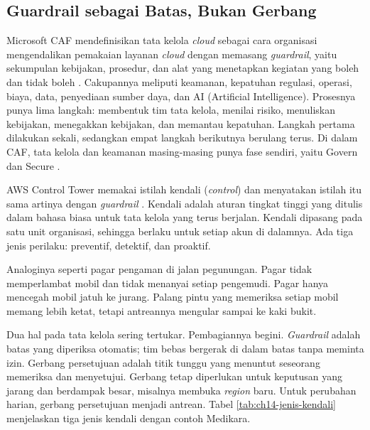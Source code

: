 \subsection{Guardrail sebagai Batas, Bukan Gerbang}

Microsoft CAF mendefinisikan tata kelola \textit{cloud} sebagai cara organisasi mengendalikan
pemakaian layanan \textit{cloud} dengan memasang \textit{guardrail}, yaitu sekumpulan kebijakan,
prosedur, dan alat yang menetapkan kegiatan yang boleh dan tidak boleh \cite{c14-azure-govern}.
Cakupannya meliputi keamanan, kepatuhan regulasi, operasi, biaya, data, penyediaan sumber daya, dan
AI (Artificial Intelligence). Prosesnya punya lima langkah: membentuk tim tata kelola, menilai
risiko, menuliskan kebijakan, menegakkan kebijakan, dan memantau kepatuhan. Langkah pertama
dilakukan sekali, sedangkan empat langkah berikutnya berulang terus. Di dalam CAF, tata kelola dan
keamanan masing-masing punya fase sendiri, yaitu Govern dan Secure \cite{azurecaf}.

AWS Control Tower memakai istilah kendali (\textit{control}) dan menyatakan istilah itu sama artinya
dengan \textit{guardrail} \cite{c14-aws-controls}. Kendali adalah aturan tingkat tinggi yang ditulis
dalam bahasa biasa untuk tata kelola yang terus berjalan. Kendali dipasang pada satu unit
organisasi, sehingga berlaku untuk setiap akun di dalamnya. Ada tiga jenis perilaku: preventif,
detektif, dan proaktif.

Analoginya seperti pagar pengaman di jalan pegunungan. Pagar tidak memperlambat mobil dan tidak
menanyai setiap pengemudi. Pagar hanya mencegah mobil jatuh ke jurang. Palang pintu yang
memeriksa setiap mobil memang lebih ketat, tetapi antreannya mengular sampai ke kaki bukit.

Dua hal pada tata kelola sering tertukar. Pembagiannya begini. \textit{Guardrail} adalah batas yang
diperiksa otomatis; tim bebas bergerak di dalam batas tanpa meminta izin. Gerbang persetujuan adalah
titik tunggu yang menuntut seseorang memeriksa dan menyetujui. Gerbang tetap diperlukan untuk
keputusan yang jarang dan berdampak besar, misalnya membuka \textit{region} baru. Untuk perubahan
harian, gerbang persetujuan menjadi antrean. Tabel \ref{tab:ch14-jenis-kendali} menjelaskan tiga
jenis kendali dengan contoh Medikara.

